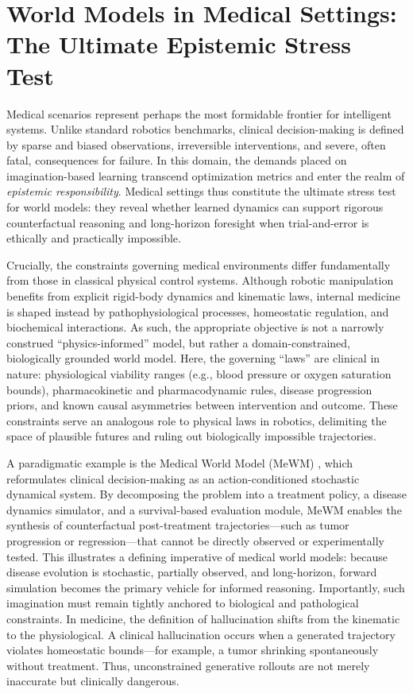 \documentclass[pdflatex,sn-mathphys-num]{sn-jnl}
\theoremstyle{thmstyleone}%
\theoremstyle{thmstyletwo}%
\theoremstyle{thmstylethree}%
\begin{document}
\section{World Models in Medical Settings: The Ultimate Epistemic Stress Test}

Medical scenarios \citep{alazab2022digital, kaul2023role, meijer2023digital, chaparro2025technological, ringeval2025advancing, de2025could} represent perhaps the most formidable frontier for intelligent systems. Unlike standard robotics benchmarks, clinical decision-making is defined by sparse and biased observations, irreversible interventions, and severe, often fatal, consequences for failure. In this domain, the demands placed on imagination-based learning transcend optimization metrics and enter the realm of \emph{epistemic responsibility}. Medical settings thus constitute the ultimate stress test for world models: they reveal whether learned dynamics can support rigorous counterfactual reasoning and long-horizon foresight when trial-and-error is ethically and practically impossible.

Crucially, the constraints governing medical environments differ fundamentally from those in classical physical control systems. Although robotic manipulation benefits from explicit rigid-body dynamics and kinematic laws, internal medicine is shaped instead by pathophysiological processes, homeostatic regulation, and biochemical interactions. As such, the appropriate objective is not a narrowly construed ``physics-informed'' model, but rather a domain-constrained, biologically grounded world model. Here, the governing ``laws'' are clinical in nature: physiological viability ranges (e.g., blood pressure or oxygen saturation bounds), pharmacokinetic and pharmacodynamic rules, disease progression priors, and known causal asymmetries between intervention and outcome. These constraints serve an analogous role to physical laws in robotics, delimiting the space of plausible futures and ruling out biologically impossible trajectories.

A paradigmatic example is the Medical World Model (MeWM) \citep{mewm}, which reformulates clinical decision-making as an action-conditioned stochastic dynamical system. By decomposing the problem into a treatment policy, a disease dynamics simulator, and a survival-based evaluation module, MeWM enables the synthesis of counterfactual post-treatment trajectories—such as tumor progression or regression—that cannot be directly observed or experimentally tested. This illustrates a defining imperative of medical world models: because disease evolution is stochastic, partially observed, and long-horizon, forward simulation becomes the primary vehicle for informed reasoning. Importantly, such imagination must remain tightly anchored to biological and pathological constraints. In medicine, the definition of hallucination shifts from the kinematic to the physiological. A clinical hallucination occurs when a generated trajectory violates homeostatic bounds—for example, a tumor shrinking spontaneously without treatment. Thus, unconstrained generative rollouts are not merely inaccurate but clinically dangerous.
\end{document}
